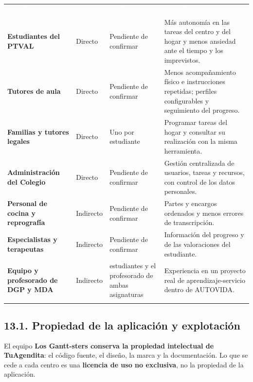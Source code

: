 \documentclass[11pt,a4paper]{article}
\newcommand{\hl}[1]{\textcolor{gblue}{\textbf{#1}}}
\begin{document}
{\small\par\noindent\begin{tabular}{@{}>{\raggedright\arraybackslash}p{}>{\raggedright\arraybackslash}p{}>{\raggedright\arraybackslash}p{}>{\raggedright\arraybackslash}p{}@{}}
\rowcolor{gblue}\textcolor{white}{\textbf{Beneficiario}} & \textcolor{white}{\textbf{Tipo}} & \textcolor{white}{\textbf{Cuántos}} & \textcolor{white}{\textbf{Beneficio principal}} \\
\hl{Estudiantes del PTVAL} & Directo & Pendiente de confirmar & Más autonomía en las tareas del centro y del hogar y menos ansiedad ante el tiempo y los imprevistos. \\ \arrayrulecolor{gline}\hline
\rowcolor{glight}
\hl{Tutores de aula} & Directo & Pendiente de confirmar & Menos acompañamiento físico e instrucciones repetidas; perfiles configurables y seguimiento del progreso. \\ \arrayrulecolor{gline}\hline
\hl{Familias y tutores legales} & Directo & Uno por estudiante & Programar tareas del hogar y consultar su realización con la misma herramienta. \\ \arrayrulecolor{gline}\hline
\rowcolor{glight}
\hl{Administración del Colegio} & Directo & Pendiente de confirmar & Gestión centralizada de usuarios, tareas y recursos, con control de los datos personales. \\ \arrayrulecolor{gline}\hline
\hl{Personal de cocina y reprografía} & Indirecto & Pendiente de confirmar & Partes y encargos ordenados y menos errores de transcripción. \\ \arrayrulecolor{gline}\hline
\rowcolor{glight}
\hl{Especialistas y terapeutas} & Indirecto & Pendiente de confirmar & Información del progreso y de las valoraciones del estudiante. \\ \arrayrulecolor{gline}\hline
\hl{Equipo y profesorado de DGP y MDA} & Indirecto & 6 estudiantes y el profesorado de ambas asignaturas & Experiencia en un proyecto real de aprendizaje-servicio dentro de AUTOVIDA. \\ \arrayrulecolor{gline}\hline
\end{tabular}\par}\medskip

\subsection*{13.1. Propiedad de la aplicación y explotación}
El equipo \hl{Los Gantt-sters conserva la propiedad intelectual de TuAgendita}: el código fuente, el diseño, la marca y la documentación. Lo que se cede a cada centro es una \hl{licencia de uso no exclusiva}, no la propiedad de la aplicación.
\end{document}
